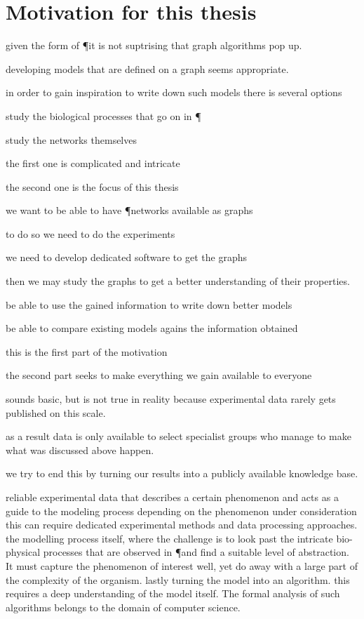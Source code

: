 \section{Motivation for this thesis}

given the form of \P it is not suptrising that graph algorithms pop up.

developing models that are defined on a graph seems appropriate.

in order to gain inspiration to write down such models there is several options

study the biological processes that go on in \P

study the networks themselves

the first one is complicated and intricate

the second one is the focus of this thesis

we want to be able to have \P networks available as graphs

to do so we need to do the experiments

we need to develop dedicated software to get the graphs

then we may study the graphs to get a better understanding of their properties.

be able to use the gained information to write down better models

be able to compare existing models agains the information obtained

this is the first part of the motivation

the second part seeks to make everything we gain available to everyone

sounds basic, but is not true in reality because experimental data rarely gets published on this scale.

as a result data is only available to select specialist groups who manage to make what was discussed above happen.

we try to end this by turning our results into a publicly available knowledge base.



reliable experimental data that describes a certain phenomenon and acts as a guide to the modeling process
depending on the phenomenon under consideration this can require dedicated experimental methods and data processing approaches.
the modelling process itself, where the challenge is to look past the intricate bio-physical processes that are observed in \P and find a suitable level of abstraction. It must capture the phenomenon of interest well, yet do away with a large part of the complexity of the organism.
lastly turning the model into an algorithm.
this requires a deep understanding of the model itself. The formal analysis of such algorithms belongs to the domain of computer science.

